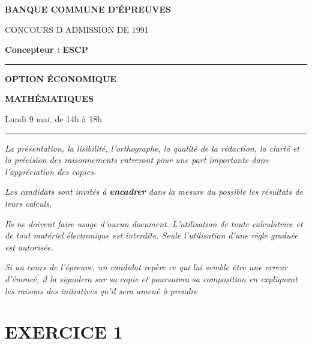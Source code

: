 \documentclass[11pt]{article}%
\begin{document}

\begin{center}
{\LARG\E\textbf{BANQUE COMMUNE D'ÉPREUVES}}



{\large \textsc{CONCOURS D ADMISSION DE 1991}}



{\large \textbf{Concepteur : ESCP}}



\rule{2.39cm}{0.05cm}



{\Large \textbf{OPTION ÉCONOMIQUE}}



{\Large \textbf{MATHÉMATIQUES }}



{\Large Lundi 9 mai, de 14h à 18h}



\rule{2.39cm}{0.05cm}
\end{center}

\textit{La présentation, la lisibilité, l'orthographe, la qualité
de la rédaction, la clarté et la précision des raisonnements
entreront pour une part importante dans l'appréciation des copies.}

\textit{Les candidats sont invités à \textbf{encadrer} dans la mesure
du possible les résultats de leurs calculs.}

\textit{Ils ne doivent faire usage d'aucun document. L'utilisation de
toute
calculatrice et de tout matériel électronique est interdite. Seule
l'utilisation d'une règle graduée est autorisée.}

\textit{Si au cours de l'épreuve, un candidat repère ce qui lui semble
être une erreur d'énoncé, il la signalera sur sa copie et
poursuivra sa composition en expliquant les raisons des initiatives
qu'il sera
amené à prendre.}

\vspace*{3cm}

\section*{EXERCICE 1}
\end{document}
